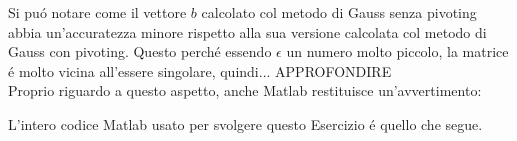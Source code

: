 \noindent Si pu\'o notare come il vettore \(b\) calcolato col metodo di Gauss senza pivoting abbia un'accuratezza minore rispetto alla sua versione calcolata col metodo di Gauss con pivoting. Questo perch\'e essendo \(\epsilon\) un numero molto piccolo, la matrice \'e molto vicina all'essere singolare, quindi... APPROFONDIRE
\\

\noindent Proprio riguardo a questo aspetto, anche Matlab restituisce un'avvertimento:

\noindent L'intero codice Matlab usato per svolgere questo Esercizio \'e quello che segue.



